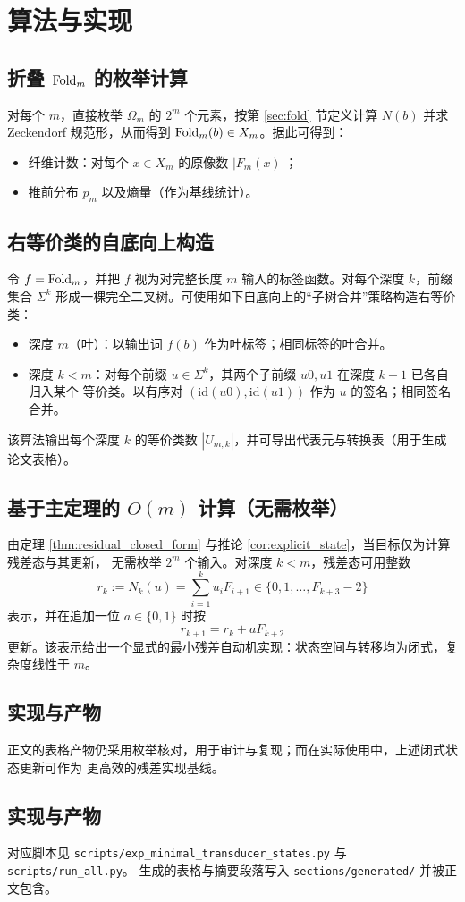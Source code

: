 \section{算法与实现}\label{sec:alg}

\subsection{\texorpdfstring{折叠 $\mathrm{Fold}_m$ 的枚举计算}{折叠 Foldm 的枚举计算}}
对每个 $m$，直接枚举 $\Omega_m$ 的 $2^m$ 个元素，按第 \ref{sec:fold} 节定义计算 $N(b)$ 并求
Zeckendorf 规范形，从而得到 $\mathrm{Fold}_m(b)\in X_m$。据此可得到：
\begin{itemize}
  \item 纤维计数：对每个 $x\in X_m$ 的原像数 $|F_m(x)|$；
  \item 推前分布 $p_m$ 以及熵量（作为基线统计）。
\end{itemize}

\subsection{右等价类的自底向上构造}
令 $f=\mathrm{Fold}_m$，并把 $f$ 视为对完整长度 $m$ 输入的标签函数。对每个深度 $k$，前缀集合 $\Sigma^k$
形成一棵完全二叉树。可使用如下自底向上的“子树合并”策略构造右等价类：
\begin{itemize}
  \item 深度 $m$（叶）：以输出词 $f(b)$ 作为叶标签；相同标签的叶合并。
  \item 深度 $k<m$：对每个前缀 $u\in\Sigma^k$，其两个子前缀 $u0,u1$ 在深度 $k+1$ 已各自归入某个
  等价类。以有序对 $(\mathrm{id}(u0),\mathrm{id}(u1))$ 作为 $u$ 的签名；相同签名合并。
\end{itemize}
该算法输出每个深度 $k$ 的等价类数 $|U_{m,k}|$，并可导出代表元与转换表（用于生成论文表格）。

\subsection{基于主定理的 \texorpdfstring{$O(m)$}{O(m)} 计算（无需枚举）}
由定理 \ref{thm:residual_closed_form} 与推论 \ref{cor:explicit_state}，当目标仅为计算残差态与其更新，
无需枚举 $2^m$ 个输入。对深度 $k<m$，残差态可用整数
\[
r_k:=N_k(u)=\sum_{i=1}^{k} u_i F_{i+1}\in\{0,1,\dots,F_{k+3}-2\}
\]
表示，并在追加一位 $a\in\{0,1\}$ 时按
\[
r_{k+1}=r_k+aF_{k+2}
\]
更新。该表示给出一个显式的最小残差自动机实现：状态空间与转移均为闭式，复杂度线性于 $m$。

\subsection{实现与产物}
正文的表格产物仍采用枚举核对，用于审计与复现；而在实际使用中，上述闭式状态更新可作为
更高效的残差实现基线。

\subsection{实现与产物}
对应脚本见 \verb|scripts/exp_minimal_transducer_states.py| 与 \verb|scripts/run_all.py|。
生成的表格与摘要段落写入 \verb|sections/generated/| 并被正文包含。


